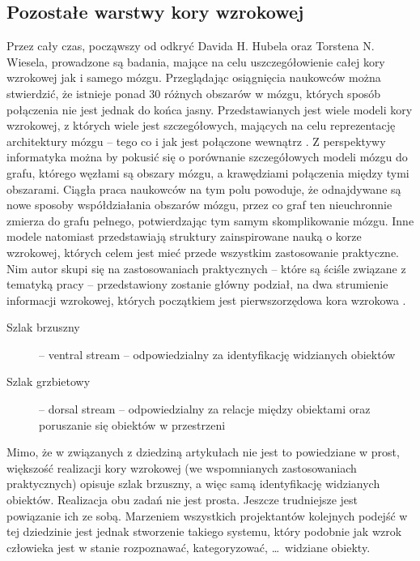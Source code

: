 \subsection{Pozostałe warstwy kory wzrokowej}
\label{restOfTheVisualLayers}
Przez cały czas, począwszy od odkryć Davida H. Hubela oraz Torstena N. Wiesela, prowadzone są badania, mające na celu uszczegółowienie całej kory wzrokowej jak i samego mózgu. Przeglądając osiągnięcia naukowców można stwierdzić, że istnieje ponad 30 różnych obszarów w mózgu, których sposób połączenia nie jest jednak do końca jasny. Przedstawianych jest wiele modeli kory wzrokowej, z których wiele jest szczegółowych, mających na celu reprezentację architektury mózgu -- tego co i jak jest połączone wewnątrz \cite{Ungerleider}. Z perspektywy informatyka można by pokusić się o porównanie szczegółowych modeli mózgu do grafu, którego węzłami są obszary mózgu, a krawędziami połączenia między tymi obszarami. Ciągła praca naukowców na tym polu powoduje, że odnajdywane są nowe sposoby współdziałania obszarów mózgu, przez co graf ten nieuchronnie zmierza do grafu pełnego, potwierdzając tym samym skomplikowanie mózgu. Inne modele natomiast przedstawiają struktury zainspirowane nauką o korze wzrokowej, których celem jest mieć przede wszystkim zastosowanie praktyczne.\\

Nim autor skupi się na zastosowaniach praktycznych -- które są ściśle związane z tematyką pracy -- przedstawiony zostanie główny podział, na dwa strumienie informacji wzrokowej, których początkiem jest pierwszorzędowa kora wzrokowa \cite{Ungerleider}.\\
\begin{description}
\item [Szlak brzuszny] -- ventral stream -- odpowiedzialny za identyfikację widzianych obiektów
\item [Szlak grzbietowy] -- dorsal stream -- odpowiedzialny za relacje między obiektami oraz poruszanie się obiektów w przestrzeni
\end{description}


Mimo, że w związanych z dziedziną artykułach nie jest to powiedziane w prost, większość realizacji kory wzrokowej (we wspomnianych zastosowaniach praktycznych) opisuje szlak brzuszny, a więc samą identyfikację widzianych obiektów. Realizacja obu zadań nie jest prosta. Jeszcze trudniejsze jest powiązanie ich ze sobą. Marzeniem wszystkich projektantów kolejnych podejść w tej dziedzinie jest jednak stworzenie takiego systemu, który podobnie jak wzrok człowieka jest w stanie rozpoznawać, kategoryzować, \ldots \ widziane obiekty.\\

